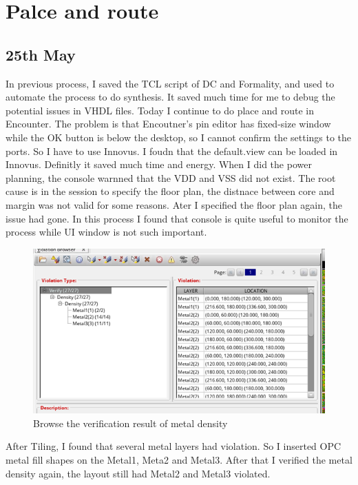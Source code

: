 \section{Palce and route}
\subsection{25th May}
In previous process, I saved the TCL script of DC and Formality, and used to automate the process to do synthesis.
It saved much time for me to debug the potential issues in VHDL files.  
 Today I continue to do place and route in Encounter. The problem is that Encoutner's pin editor has fixed-size window
 while the OK button is below the desktop, so I cannot confirm the settings to the ports. So I have to use Innovus.
 I foudn that the default.view can be loaded in Innovus. Definitly it saved much time and energy. When I did the power planning,
 the console warnned that the VDD and VSS did not exist. The root cause is in the session to specify the floor plan, the distnace between
 core and margin was not valid for some reasons. Ater I specified the floor plan again, the issue had gone. In this process I found that 
 console is quite useful to monitor the process while UI window is not such important.

\begin{figure}[!h]
    \centerline{\includegraphics[width=15cm]{./Figures/MetalFilling.png}}
    \caption{Browse the verification result of metal density \label{fig4} }
\end{figure}

After Tiling, I found that several metal layers had violation. So I inserted OPC metal
fill shapes on the Metal1, Meta2 and Metal3. After that I verified the metal density again, the layout
still had Metal2 and Metal3 violated.

